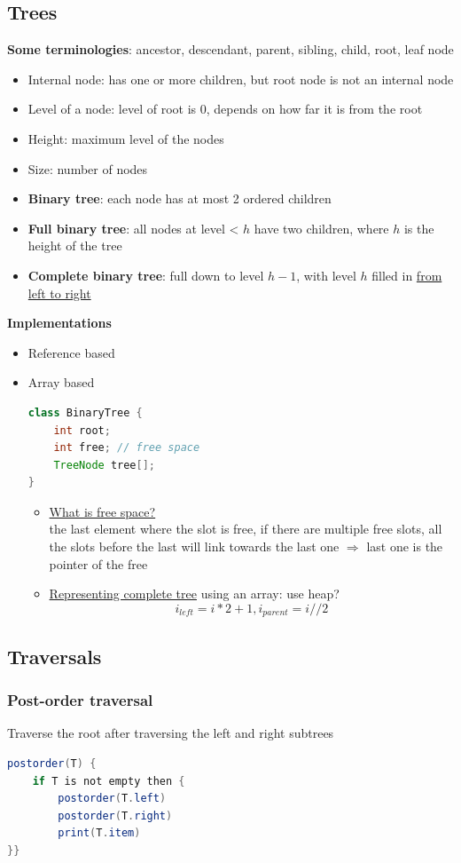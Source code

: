\documentclass{article}
\begin{document}
\begin{multicols}{2}
\section{Trees}
\textbf{Some terminologies}: ancestor, descendant, parent, sibling, child, root, leaf node
\begin{itemize}
	\item Internal node: has one or more children, but root node is not an internal node
	\item Level of a node: level of root is 0, depends on how far it is from the root
	\item Height: maximum level of the nodes
	\item Size: number of nodes
	\item \textbf{Binary tree}: each node has at most 2 ordered children
	\item \textbf{Full binary tree}: all nodes at level < $h$ have two children, where $h$ is the height of the tree
	\item \textbf{Complete binary tree}: full down to level $h-1$, with level $h$ filled in \underline{from left to right}
\end{itemize}
\textbf{Implementations}
\begin{itemize}
	\item Reference based
	\item Array based
	\begin{lstlisting}[language=java]
class BinaryTree {
	int root;
	int free; // free space
	TreeNode tree[];
}
	\end{lstlisting}
\begin{itemize}
	\item \underline{What is free space?}\\
	the last element where the slot is free, if there are multiple free slots, all the slots before the last will link towards the last one $\Rightarrow$ last one is the pointer of the free
	\item \underline{Representing complete tree} using an array: use heap?
	$$i_{left} = i*2+1, i_{parent} = i//2$$
\end{itemize}
\end{itemize}

\subsection{Traversals}
\subsubsection{Post-order traversal}
Traverse the root after traversing the left and right subtrees
\begin{lstlisting}[language=java]
postorder(T) {
	if T is not empty then {
		postorder(T.left)
		postorder(T.right)
		print(T.item)
}}
\end{lstlisting}

\end{multicols}
\end{document}
